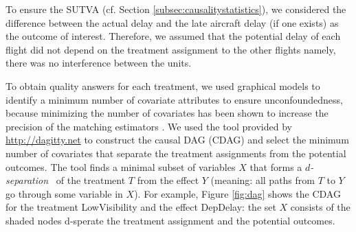 
 To ensure the SUTVA (cf. Section \ref{subsec:causalitystatistics}),  we considered the difference between the
actual delay and the late aircraft delay (if one exists) as the
outcome of interest. Therefore, we assumed that the potential delay of each flight did not depend on the treatment assignment
to the other flights namely, there was no interference between the units. 






To obtain quality answers for each treatment, we used graphical models
to identify a minimum number of covariate attributes to ensure
unconfoundedness, because minimizing the number of covariates has been
shown to increase the precision of the matching estimators
\cite{de2011covariate}.  We used the tool provided by
\url{http://dagitty.net} to construct the causal DAG (CDAG) and select
the minimum number of covariates that separate the treatment assignments from  the potential outcomes.  The tool finds a minimal subset of variables $X$ that forms a
{\em $d$-separation}~\cite{PearlBook2000} of the treatment $T$ from
the effect $Y$ (meaning: all paths from $T$ to $Y$ go through some
variable in $X$).  For example, Figure \ref{fig:dag} shows the CDAG
for the treatment LowVisibility and the effect DepDelay: the set $X$
consists of the shaded nodes d-sperate the treatment assignment and the potential outcomes.

